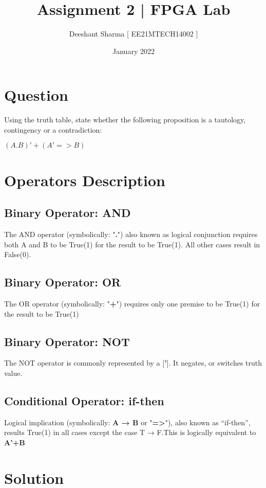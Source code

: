 \documentclass{article}
\title{\textbf{Assignment 2}  |\textbf{ FPGA Lab}}
\author{Deeshant Sharma [ EE21MTECH14002 ]}
\date{January 2022}
\begin{document}
\maketitle

\section{Question}

Using the truth table, state whether the following proposition is a tautology, contingency or a contradiction:
\begin{center}
    $ ( A . B )' + (  A' => B ) $
\end{center}

\section{Operators Description}
\subsection{Binary Operator: AND}
The AND operator (symbolically: "\textbf{.}") also known as logical conjunction requires both A and B to be True(1) for the result to be True(1). All other cases result in False(0).

\subsection{Binary Operator: OR}
The OR operator (symbolically: "\textbf{+}") requires only one premise to be True(1) for the result to be True(1)

\subsection{Binary Operator: NOT}
The NOT operator is commonly represented by a [\textbf{'}]. It negates, or switches truth value.

\subsection{Conditional Operator: if-then}
Logical implication (symbolically:\textbf{ A → B} or "\textbf{=>}"), also known as “if-then”, results True(1) in all cases except the case T → F.This is logically equivalent to \textbf{A'+B}

\section{Solution}
\end{document}
